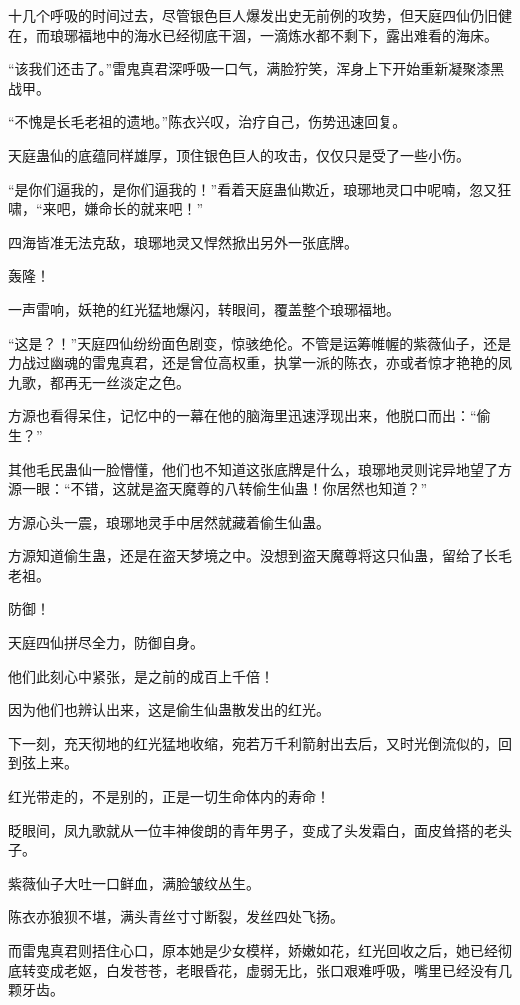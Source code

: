 \begin{this_body}
十几个呼吸的时间过去，尽管银色巨人爆发出史无前例的攻势，但天庭四仙仍旧健在，而琅琊福地中的海水已经彻底干涸，一滴炼水都不剩下，露出难看的海床。

“该我们还击了。”雷鬼真君深呼吸一口气，满脸狞笑，浑身上下开始重新凝聚漆黑战甲。

“不愧是长毛老祖的遗地。”陈衣兴叹，治疗自己，伤势迅速回复。

天庭蛊仙的底蕴同样雄厚，顶住银色巨人的攻击，仅仅只是受了一些小伤。

“是你们逼我的，是你们逼我的！”看着天庭蛊仙欺近，琅琊地灵口中呢喃，忽又狂啸，“来吧，嫌命长的就来吧！”

四海皆准无法克敌，琅琊地灵又悍然掀出另外一张底牌。

轰隆！

一声雷响，妖艳的红光猛地爆闪，转眼间，覆盖整个琅琊福地。

“这是？！”天庭四仙纷纷面色剧变，惊骇绝伦。不管是运筹帷幄的紫薇仙子，还是力战过幽魂的雷鬼真君，还是曾位高权重，执掌一派的陈衣，亦或者惊才艳艳的凤九歌，都再无一丝淡定之色。

方源也看得呆住，记忆中的一幕在他的脑海里迅速浮现出来，他脱口而出：“偷生？”

其他毛民蛊仙一脸懵懂，他们也不知道这张底牌是什么，琅琊地灵则诧异地望了方源一眼：“不错，这就是盗天魔尊的八转偷生仙蛊！你居然也知道？”

方源心头一震，琅琊地灵手中居然就藏着偷生仙蛊。

方源知道偷生蛊，还是在盗天梦境之中。没想到盗天魔尊将这只仙蛊，留给了长毛老祖。

防御！

天庭四仙拼尽全力，防御自身。

他们此刻心中紧张，是之前的成百上千倍！

因为他们也辨认出来，这是偷生仙蛊散发出的红光。

下一刻，充天彻地的红光猛地收缩，宛若万千利箭射出去后，又时光倒流似的，回到弦上来。

红光带走的，不是别的，正是一切生命体内的寿命！

眨眼间，凤九歌就从一位丰神俊朗的青年男子，变成了头发霜白，面皮耸搭的老头子。

紫薇仙子大吐一口鲜血，满脸皱纹丛生。

陈衣亦狼狈不堪，满头青丝寸寸断裂，发丝四处飞扬。

而雷鬼真君则捂住心口，原本她是少女模样，娇嫩如花，红光回收之后，她已经彻底转变成老妪，白发苍苍，老眼昏花，虚弱无比，张口艰难呼吸，嘴里已经没有几颗牙齿。


\end{this_body}
